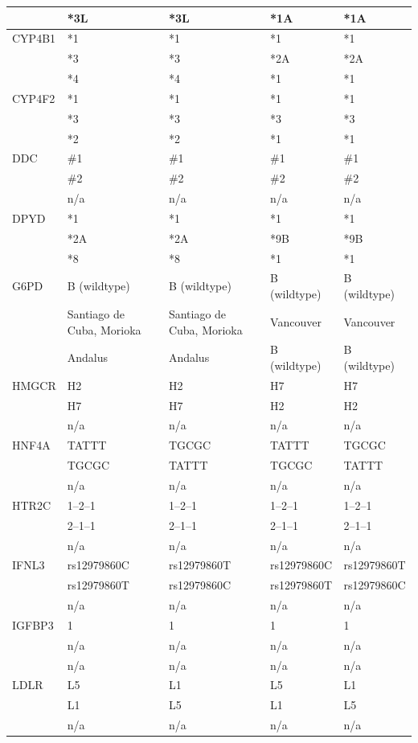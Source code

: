 \documentclass{report}
\begin{document}
\begin{tabularx}{\textwidth}{ X | XXXX }
& *3L & *3L & *1A & *1A \\
\midrule
CYP4B1
& *1 & *1 & *1 & *1 \\
& *3 & *3 & *2A & *2A  \\
& *4 & *4 & *1 & *1 \\
\midrule
CYP4F2
& *1 & *1 & *1 & *1 \\
& *3 & *3 & *3 & *3  \\
& *2 & *2 & *1 & *1 \\
\midrule
DDC
& \#1 & \#1 & \#1 & \#1 \\
& \#2 & \#2 & \#2 & \#2  \\
& n/a & n/a & n/a & n/a \\
\midrule
DPYD
& *1 & *1 & *1 & *1 \\
& *2A & *2A & *9B & *9B  \\
& *8 & *8 & *1 & *1 \\
\midrule
G6PD
& B (wildtype) & B (wildtype) & B (wildtype) & B (wildtype) \\
& Santiago de Cuba, Morioka & Santiago de Cuba, Morioka & Vancouver & Vancouver  \\
& Andalus & Andalus & B (wildtype) & B (wildtype) \\
\midrule
HMGCR
& H2 & H2 & H7 & H7 \\
& H7 & H7 & H2 & H2  \\
& n/a & n/a & n/a & n/a \\
\midrule
HNF4A
& TATTT & TGCGC & TATTT & TGCGC \\
& TGCGC & TATTT & TGCGC & TATTT  \\
& n/a & n/a & n/a & n/a \\
\midrule
HTR2C
& 1--2--1 & 1--2--1 & 1--2--1 & 1--2--1 \\
& 2--1--1 & 2--1--1 & 2--1--1 & 2--1--1  \\
& n/a & n/a & n/a & n/a \\
\midrule
IFNL3
& rs12979860C & rs12979860T & rs12979860C & rs12979860T \\
& rs12979860T & rs12979860C & rs12979860T & rs12979860C  \\
& n/a & n/a & n/a & n/a \\
\midrule
IGFBP3
& 1 & 1 & 1 & 1 \\
& n/a & n/a & n/a & n/a  \\
& n/a & n/a & n/a & n/a \\
\midrule
LDLR
& L5 & L1 & L5 & L1 \\
& L1 & L5 & L1 & L5  \\
& n/a & n/a & n/a & n/a \\

\end{tabularx}
\end{document}
